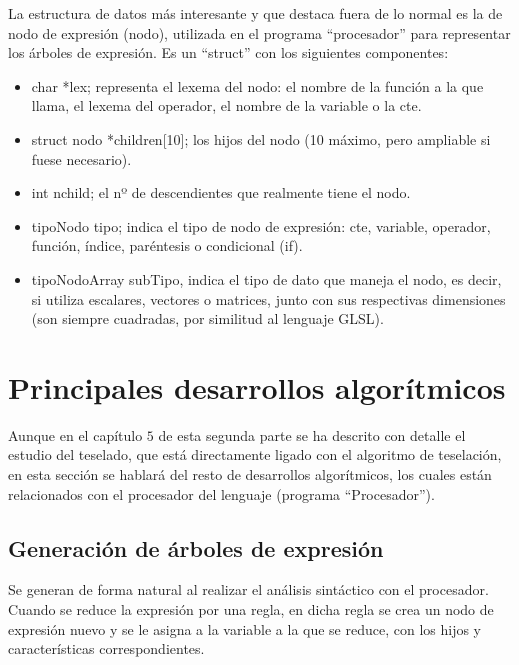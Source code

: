 La estructura de datos más interesante y que destaca fuera de lo normal es la de nodo de expresión (nodo), utilizada en el programa ``procesador'' para representar los árboles de expresión. Es un ``struct'' con los siguientes componentes:
\begin{itemize}
	\item char *lex; representa el lexema del nodo: el nombre de la función a la que llama, el lexema del operador, el nombre de la variable o la cte.
	\item struct nodo *children[10]; los hijos del nodo (10 máximo, pero ampliable si fuese necesario).
	\item int nchild; el nº de descendientes que realmente tiene el nodo.
	\item tipoNodo tipo; indica el tipo de nodo de expresión: cte, variable, operador, función, índice, paréntesis o condicional (if).
	\item tipoNodoArray subTipo, indica el tipo de dato que maneja el nodo, es decir, si utiliza escalares, vectores o matrices, junto con sus respectivas dimensiones (son siempre cuadradas, por similitud al lenguaje GLSL).
\end{itemize}

\section{Principales desarrollos algorítmicos}

Aunque en el capítulo $5$ de esta segunda parte se ha descrito con detalle el estudio del teselado, que está directamente ligado con el algoritmo de teselación, en esta sección se hablará del resto de desarrollos algorítmicos, los cuales están relacionados con el procesador del lenguaje (programa ``Procesador'').

\subsection*{Generación de árboles de expresión}
Se generan de forma natural al realizar el análisis sintáctico con el procesador. Cuando se reduce la expresión por una regla, en dicha regla se crea un nodo de expresión nuevo y se le asigna a la variable a la que se reduce, con los hijos y características correspondientes.


